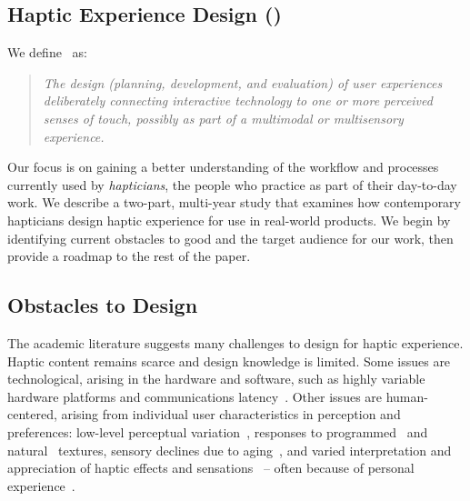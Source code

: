 \subsection{Haptic Experience Design (\haxd{})}
\noindent
We define \haxd\ as: %
\begin{quote}
\it The design (planning, development, and evaluation) of user experiences  deliberately connecting interactive technology to
one or more perceived senses of touch, possibly as part of a multimodal or multisensory experience.
\end{quote}
Our focus is on gaining a better understanding of the workflow and processes currently used by \textit{hapticians}, the people who practice \haxd{} as part of their day-to-day work. We describe a two-part, multi-year study that examines how contemporary hapticians design haptic experience for use in real-world products. We begin by identifying current obstacles to good \haxd{} and the target audience for our work,  then provide a roadmap to the rest of the paper.


\subsection{Obstacles to Design} 
\noindent
The academic literature suggests many challenges to design for haptic experience.
Haptic content remains scarce and design knowledge is limited.
Some issues are technological, arising in the hardware and software, such as highly variable hardware platforms and communications latency~\citep{Kaaresoja2014}. 
Other issues are human-centered, arising from individual user characteristics in perception and preferences:
low-level perceptual variation~\citep{Lo1984}, 
responses to programmed~\citep{Levesque2011} and natural~\citep{Hollins2000} textures, 
sensory declines due to aging~\citep{Stevens1992,Stevens1996}, 
and  varied interpretation and appreciation of haptic effects and sensations~\citep{Seifi2013,Seifi2015} -- often because of personal experience~\citep{Schneider2014}.

